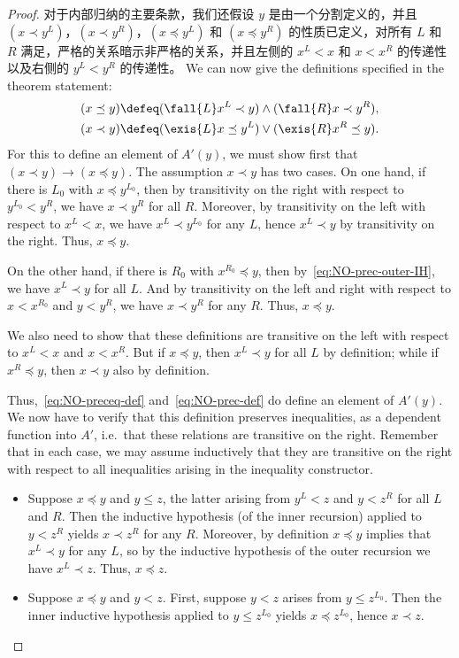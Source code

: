 \begin{proof}
  对于内部归纳的主要条款，我们还假设 $y$ 是由一个分割定义的，并且 $(x\prec y^L)$，$(x\prec y^R)$，$(x\preceq y^L)$ 和 $(x\preceq y^R)$ 的性质已定义，对所有 $L$ 和 $R$ 满足，严格的关系暗示非严格的关系，并且左侧的 $x^L<x$ 和 $x<x^R$ 的传递性以及右侧的 $y^L<y^R$ 的传递性。
  We can now give the definitions specified in the theorem statement:
  \begin{align}
    (x\preceq y) &\defeq
    (\fall{L} x^L\prec y) \land (\fall{R} x\prec y^R), \label{eq:NO-preceq-def}\\
    (x\prec y) &\defeq
    (\exis{L} x\preceq y^L) \lor (\exis{R} x^R \preceq y).\label{eq:NO-prec-def}
  \end{align}
  For this to define an element of $A'(y)$, we must show first that $(x\prec y) \to (x\preceq y)$.
  The assumption $x\prec y$ has two cases.
  On one hand, if there is $L_0$ with $x\preceq y^{L_0}$, then by transitivity on the right with respect to $y^{L_0}<y^R$, we have $x\prec y^R$ for all $R$.
  Moreover, by transitivity on the left with respect to $x^L<x$, we have $x^L \prec y^{L_0}$ for any $L$, hence $x^L\prec y$ by transitivity on the right.
  Thus, $x\preceq y$.

  On the other hand, if there is $R_0$ with $x^{R_0}\preceq y$, then by~\eqref{eq:NO-prec-outer-IH}, we have $x^L \prec y$ for all $L$.
  And by transitivity on the left and right with respect to $x<x^{R_0}$ and $y<y^R$, we have $x\prec y^R$ for any $R$.
  Thus, $x\preceq y$.

  We also need to show that these definitions are transitive on the left with respect to $x^L<x$ and $x<x^R$.
  But if $x\preceq y$, then $x^L\prec y$ for all $L$ by definition; while if $x^R\preceq y$, then $x\prec y$ also by definition.

  Thus,~\eqref{eq:NO-preceq-def} and~\eqref{eq:NO-prec-def} do define an element of $A'(y)$.
  We now have to verify that this definition preserves inequalities, as a dependent function into $A'$, i.e.\ that these relations are transitive on the right.
  Remember that in each case, we may assume inductively that they are transitive on the right with respect to all inequalities arising in the inequality constructor.
  \begin{itemize}
  \item Suppose $x\preceq y$ and $y\le z$, the latter arising from $y^L<z$ and $y<z^R$ for all $L$ and $R$.
    Then the inductive hypothesis (of the inner recursion) applied to $y<z^R$ yields $x\prec z^R$ for any $R$.
    Moreover, by definition $x\preceq y$ implies that $x^L \prec y$ for any $L$, so by the inductive hypothesis of the outer recursion we have $x^L \prec z$.
    Thus, $x\preceq z$.
  \item Suppose $x\preceq y$ and $y<z$.
    First, suppose $y<z$ arises from $y\le z^{L_0}$.
    Then the inner inductive hypothesis applied to $y\le z^{L_0}$ yields $x \preceq z^{L_0}$, hence $x\prec z$.


\end{itemize}
\end{proof}
